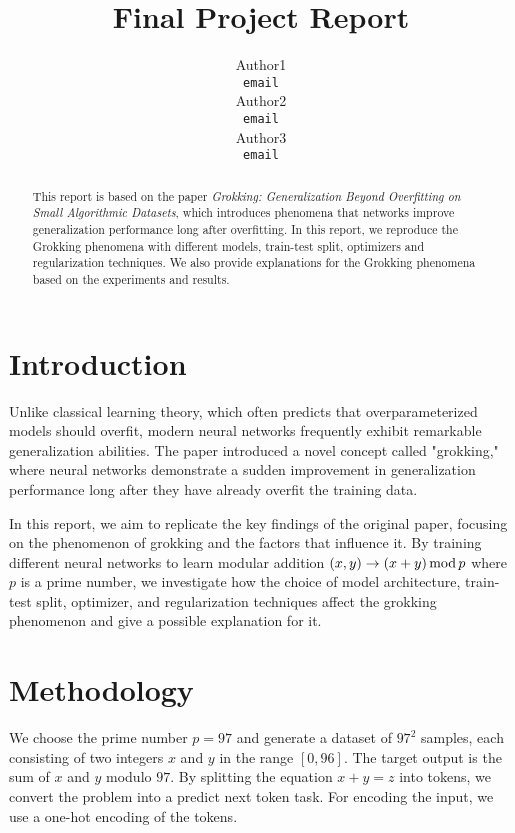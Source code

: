 \documentclass{article}
\title{Final Project Report}
\author{
    Author1 \\
    \texttt{email} \\
    \And
    Author2 \\
    \texttt{email} \\
    \And
    Author3 \\
    \texttt{email} \\
}
\begin{document}
\maketitle

\begin{abstract}
    This report is based on the paper \textit{Grokking: Generalization Beyond Overfitting on Small Algorithmic Datasets}, which introduces phenomena that networks improve generalization performance long after overfitting. In this report, we reproduce the Grokking phenomena with different models, train-test split, optimizers and regularization techniques. We also provide explanations for the Grokking phenomena based on the experiments and results.
\end{abstract}

\section{Introduction}

Unlike classical learning theory, which often predicts that overparameterized models should overfit, modern neural networks frequently exhibit remarkable generalization abilities. The paper introduced a novel concept called "grokking," where neural networks demonstrate a sudden improvement in generalization performance long after they have already overfit the training data.

In this report, we aim to replicate the key findings of the original paper, focusing on the phenomenon of grokking and the factors that influence it. By training different neural networks to learn modular addition $(x, y) \rightarrow (x + y)\, {\rm mod}\, p$ where $p$ is a prime number, we investigate how the choice of model architecture, train-test split, optimizer, and regularization techniques affect the grokking phenomenon and give a possible explanation for it.

\section{Methodology}

We choose the prime number $p=97$ and generate a dataset of $97^2$ samples, each consisting of two integers $x$ and $y$ in the range $[0, 96]$. The target output is the sum of $x$ and $y$ modulo $97$. By splitting the equation $x + y = z$ into tokens, we convert the problem into a predict next token task. For encoding the input, we use a one-hot encoding of the tokens.
\end{document}
